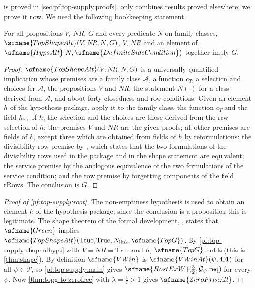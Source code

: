  is proved in \cref{sec:pf:top-supply:proofs}.  only combines
results proved elsewhere; we prove it now. We need the following bookkeeping statement.

\begin{lemma}\label{pf:top-supply:shapeofhyps}
For all propositions $V$, $N\!R$, $G$ and every predicate $N$ on family classes,
$\sfname{TopShapeAlt}(V,N\!R,N,G)$, $V$, $N\!R$ and an element of $\sfname{HypsAlt}(N,\sfname{DefiniteSideCondition})$
together imply $G$.
 
\end{lemma}

\begin{proof}
$\sfname{TopShapeAlt}(V,N\!R,N,G)$ is a universally quantified implication whose premises are a family class
$\mathcal A$, a function $c_T$, a selection and choices for $\mathcal A$, the propositions $V$ and $N\!R$, the
statement $N(\cdot)$ for a class derived from $\mathcal A$, and about forty closedness and row conditions.
Given an element $h$ of the hypothesis package, apply it to the family class,
the function $c_T$ and the field $h_{\mathrm{Ex}}$ of $h$; the selection and the choices are those derived from the raw
selection of $h$; the premises $V$ and $N\!R$ are the given proofs; all other premises are fields of $h$, except
three which are obtained from fields of $h$ by reformulations: the divisibility-row premise by
, which states that the two formulations of the divisibility rows used in the
package and in the shape statement are equivalent; the service premise by the analogous equivalence of the two
formulations of the service condition; and the row premise by forgetting components of the field
$\mathrm{rRows}$. The conclusion is $G$.
\end{proof}

\begin{proof}[Proof of \cref{pf:top-supply:root}]
The non-emptiness hypothesis is used to obtain an element $h$ of the hypothesis package; since the conclusion is a
proposition this is legitimate. The shape theorem of the formal development,
, states that $\sfname{Green}$ implies
$\sfname{TopShapeAlt}(\mathrm{True},\mathrm{True},N_{\rm link},\sfname{TopG})$. By \cref{pf:top-supply:shapeofhyps}
with $V=N\!R=\mathrm{True}$ and $h$, $\sfname{TopG}$ holds (this is \cref{thm:shape}). By definition $\sfname{VWin}$
is $\sfname{VWinAt}(\psi,401)$ for all $\psi\in\mathcal P$, so \cref{pf:top-supply:main} gives
$\sfname{HostExW}(\frac32,\mathcal G_\psi.\mathrm{req})$ for every $\psi$. Now \cref{thm:topg-to-zerofree} with
$\lambda=\frac32>1$ gives $\sfname{ZeroFreeAll}$.
\end{proof}

